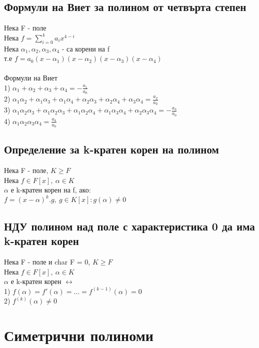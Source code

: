\documentclass[12pt]{article}
\begin{document}
\subsection{Формули на Виет за полином от четвърта степен}
Нека F - поле \\
Нека $f = \sum\limits_{i=0}^{4}a_ix^{4-i}$ \\
Нека $\alpha_1 , \alpha_2 , \alpha_3 , \alpha_4$ - са корени на f \\
т.е $f = a_0(x-\alpha_1)(x-\alpha_2)(x-\alpha_3)(x-\alpha_4)$ \\\\
Формули на Виет\\
1) $\alpha_1 + \alpha_2 + \alpha_3 + \alpha_4 = -\frac{a_1}{a_0}$ \\
2) $\alpha_1\alpha_2 + \alpha_1\alpha_3 + \alpha_1\alpha_4 + \alpha_2\alpha_3 + \alpha_2\alpha_4 + \alpha_3\alpha_4 = \frac{a_2}{a_0}$\\
3) $\alpha_1\alpha_2\alpha_3 + \alpha_1\alpha_2\alpha_3 + \alpha_1\alpha_2\alpha_4 + \alpha_1\alpha_3\alpha_4 + \alpha_2\alpha_3\alpha_4 = -\frac{a_3}{a_0}$\\
4) $\alpha_1\alpha_2\alpha_3\alpha_4 = \frac{a_4}{a_0}$

\subsection{Определение за k-кратен корен на полином}
Нека F - поле, $K \geq F$ \\
Нека $f \in F[x],\ \alpha \in K$  \\
$\alpha$ е k-кратен корен на f, ако:\\
$f = (x-\alpha)^k.g, \ g \in K[x] : g(\alpha) \neq 0$

\subsection{НДУ полином над поле с характеристика 0 да има k-кратен корен}
Нека F - поле и char F = 0, $K \geq F$ \\
Нека $f \in F[x],\ \alpha \in K$\\
$\alpha$ е k-кратен корен $\leftrightarrow $\\
1) $f(\alpha) = f'(\alpha)=...=f^{(k-1)}(\alpha) = 0$ \\
2) $f^{(k)}(\alpha) \neq 0$

\section{Симетрични полиноми}
\end{document}
